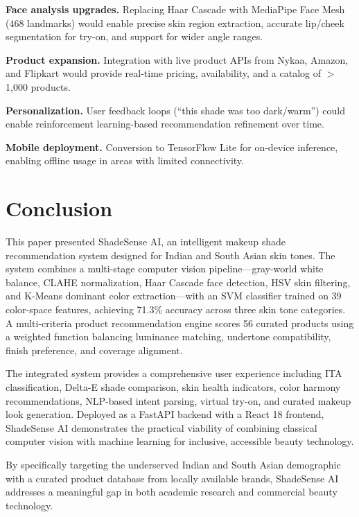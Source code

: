 \documentclass[conference]{IEEEtran}
\begin{document}
\textbf{Face analysis upgrades.} Replacing Haar Cascade with MediaPipe Face Mesh (468 landmarks) would enable precise skin region extraction, accurate lip/cheek segmentation for try-on, and support for wider angle ranges.

\textbf{Product expansion.} Integration with live product APIs from Nykaa, Amazon, and Flipkart would provide real-time pricing, availability, and a catalog of $>$ 1,000 products.

\textbf{Personalization.} User feedback loops (``this shade was too dark/warm'') could enable reinforcement learning-based recommendation refinement over time.

\textbf{Mobile deployment.} Conversion to TensorFlow Lite for on-device inference, enabling offline usage in areas with limited connectivity.

\section{Conclusion}

This paper presented ShadeSense AI, an intelligent makeup shade recommendation system designed for Indian and South Asian skin tones. The system combines a multi-stage computer vision pipeline---gray-world white balance, CLAHE normalization, Haar Cascade face detection, HSV skin filtering, and K-Means dominant color extraction---with an SVM classifier trained on 39 color-space features, achieving 71.3\% accuracy across three skin tone categories. A multi-criteria product recommendation engine scores 56 curated products using a weighted function balancing luminance matching, undertone compatibility, finish preference, and coverage alignment.

The integrated system provides a comprehensive user experience including ITA classification, Delta-E shade comparison, skin health indicators, color harmony recommendations, NLP-based intent parsing, virtual try-on, and curated makeup look generation. Deployed as a FastAPI backend with a React 18 frontend, ShadeSense AI demonstrates the practical viability of combining classical computer vision with machine learning for inclusive, accessible beauty technology.

By specifically targeting the underserved Indian and South Asian demographic with a curated product database from locally available brands, ShadeSense AI addresses a meaningful gap in both academic research and commercial beauty technology.
\end{document}
